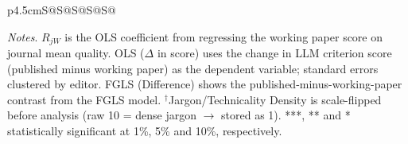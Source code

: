 \begin{table}[H]
\begin{threeparttable}
\begin{tabular}{p{4.5cm}S@{}S@{}S@{}S@{}S@{}}
            \bottomrule
        \end{tabular}
        \begin{tablenotes}
            \tiny
            \item \textit{Notes}. $R_{jW}$ is the OLS coefficient from regressing the working paper score on journal mean quality. OLS ($\Delta$ in score) uses the change in LLM criterion score (published minus working paper) as the dependent variable; standard errors clustered by editor. FGLS (Difference) shows the published-minus-working-paper contrast from the FGLS model. \(^\dagger\)Jargon/Technicality Density is scale-flipped before analysis (raw 10 = dense jargon $\rightarrow$ stored as 1). ***, ** and * statistically significant at 1\%, 5\% and 10\%, respectively.
        \end{tablenotes}
    \end{threeparttable}
\end{table}

